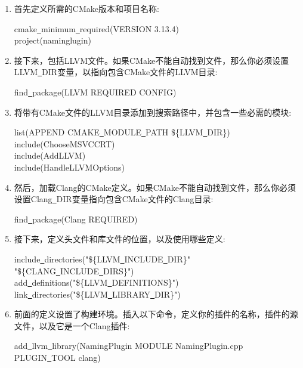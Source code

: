 \begin{enumerate}
\item 首先定义所需的CMake版本和项目名称:
\begin{tcolorbox}[colback=white,colframe=black]
cmake\underline{~}minimum\underline{~}required(VERSION 3.13.4) \\
project(naminglugin)
\end{tcolorbox}

\item 接下来，包括LLVM文件。如果CMake不能自动找到文件，那么你必须设置LLVM\underline{~}DIR变量，以指向包含CMake文件的LLVM目录:
\begin{tcolorbox}[colback=white,colframe=black]
find\underline{~}package(LLVM REQUIRED CONFIG)
\end{tcolorbox}

\item 将带有CMake文件的LLVM目录添加到搜索路径中，并包含一些必需的模块:
\begin{tcolorbox}[colback=white,colframe=black]
list(APPEND CMAKE\underline{~}MODULE\underline{~}PATH \$\{LLVM\underline{~}DIR\}) \\ 
include(ChooseMSVCCRT) \\
include(AddLLVM) \\
include(HandleLLVMOptions)
\end{tcolorbox}

\item 然后，加载Clang的CMake定义。如果CMake不能自动找到文件，那么你必须设置Clang\underline{~}DIR变量指向包含CMake文件的Clang目录:
\begin{tcolorbox}[colback=white,colframe=black]
find\underline{~}package(Clang REQUIRED)
\end{tcolorbox}

\item 接下来，定义头文件和库文件的位置，以及使用哪些定义:
\begin{tcolorbox}[colback=white,colframe=black]
include\underline{~}directories("\$\{LLVM\underline{~}INCLUDE\underline{~}DIR\}" \\
\hspace*{1cm}"\$\{CLANG\underline{~}INCLUDE\underline{~}DIRS\}") \\
add\underline{~}definitions("\$\{LLVM\underline{~}DEFINITIONS\}") \\
link\underline{~}directories("\$\{LLVM\underline{~}LIBRARY\underline{~}DIR\}")
\end{tcolorbox}

\item 前面的定义设置了构建环境。插入以下命令，定义你的插件的名称，插件的源文件，以及它是一个Clang插件:
\begin{tcolorbox}[colback=white,colframe=black]
add\underline{~}llvm\underline{~}library(NamingPlugin MODULE NamingPlugin.cpp \\
\hspace*{3cm}PLUGIN\underline{~}TOOL clang)
\end{tcolorbox}


\end{enumerate}
